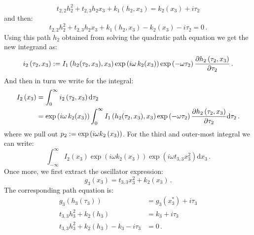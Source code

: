 \documentclass[a4paper,10pt]{article}
\begin{document}
\begin{equation}
  t_{2,2} h_2^2 + t_{2,3} h_2 x_3 + k_1(h_2, x_3) = k_2(x_3) + i \tau_2
\end{equation}
and then:
\begin{equation}
  t_{2,2} h_2^2 + t_{2,3} h_2 x_3 + k_1(h_2, x_3) - k_2(x_3) - i \tau_2 = 0 \,.
\end{equation}
Using this path $h_2$ obtained from solving the quadratic
path equation we get the new integrand as:
\begin{equation}
  i_2\left(\tau_2, x_3\right) := I_1\left(h_2(\tau_2, x_3), x_3\right)
                                 \exp\left(i \omega \,k_2\!\left(x_3\right) \right)
                                 \exp\left(- \omega \tau_2 \right)
                                 \frac{\partial h_2\left(\tau_2, x_3\right)}{\partial \tau_2} \,.
\end{equation}
And then in turn we write for the integral:
\begin{equation*}
\begin{split}
  I_2\left(x_3\right) & = \int_0^{\infty} i_2\left(\tau_2, x_3\right) \mathrm{d}\tau_2 \\
                      & = \exp\left(i \omega \,k_2\!\left(x_3\right) \right)
                          \int_0^{\infty} I_1\left(h_2(\tau_2, x_3), x_3\right)
                                          \exp\left(- \omega \tau_2 \right)
                                          \frac{\partial h_2\left(\tau_2, x_3\right)}{\partial \tau_2}
                          \mathrm{d}\tau_2 \,.
\end{split}
\end{equation*}
where we pull out $p_2 := \exp\left(i \omega k_2\left(x_3\right) \right)$.
For the third and outer-most integral we can write:
\begin{equation}
  \int_{-\infty}^{\infty} I_2\left(x_3\right)
                          \exp\left(i \omega k_2\left(x_3\right) \right)
                          \exp\left(i \omega t_{3,3} x_3^2\right)
  \mathrm{d}x_3 \,.
\end{equation}
Once more, we first extract the oscillator expression:
\begin{equation}
  g_3\left(x_3\right) = t_{3,3} x_3^2 + k_2(x_3)\,.
\end{equation}
The corresponding path equation is:
\begin{equation}
\begin{split}
  g_3\left(h_3\left(\tau_3\right)\right) & = g_3(x_3^{*}) + i \tau_3 \\
  t_{3,3} h_3^2 + k_2(h_3) & = k_3 + i \tau_3 \\
  t_{3,3} h_3^2 + k_2(h_3) - k_3 - i \tau_3 & = 0 \,.
\end{split}
\end{equation}
\end{document}
